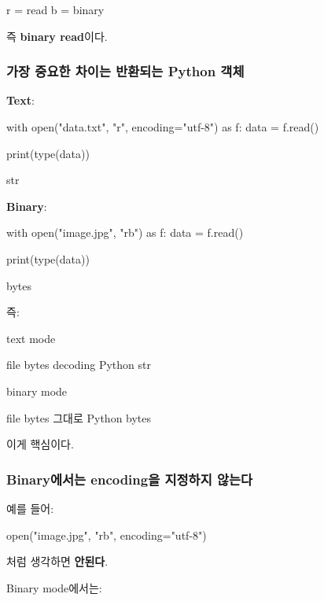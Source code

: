 \begin{dhksmry}[centered]
    r = read
    b = binary
\end{dhksmry}

즉 \textbf{binary read}이다.

\subsubsection{가장 중요한 차이는 반환되는 Python 객체}

\textbf{Text}:

\begin{dhkcode}
with open("data.txt", "r", encoding="utf-8") as f:
    data = f.read()

print(type(data))
\end{dhkcode}

\begin{dhkzsh}
str
\end{dhkzsh}

\textbf{Binary}:

\begin{dhkcode}
with open("image.jpg", "rb") as f:
    data = f.read()

print(type(data))
\end{dhkcode}

\begin{dhkzsh}
bytes
\end{dhkzsh}

즉:

\begin{dhksmry}[centered]
text mode

file bytes
\da
decoding
\da
Python str



binary mode

file bytes
\da
그대로
\da
Python bytes
\end{dhksmry}

이게 핵심이다.

\subsubsection{Binary에서는 encoding을 지정하지 않는다}

예를 들어:

\begin{dhkcode}
open("image.jpg", "rb", encoding="utf-8")
\end{dhkcode}

처럼 생각하면 \textbf{안된다}.

Binary mode에서는:

